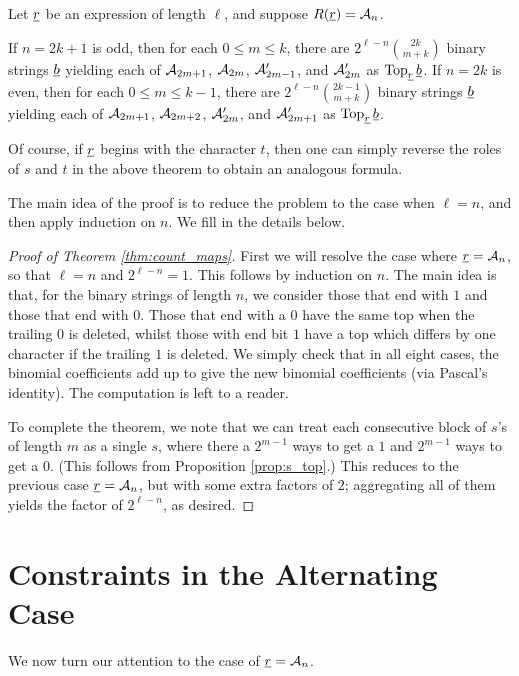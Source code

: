 \begin{theorem}
	Let $\ul r$ be an expression of length $\ell$, and suppose $R(\ul r) = \AA_n$.
	\begin{enumerate}[(i)]
		\ii If $n=2k+1$ is odd, then for each $0 \le m \le k$, there are $2^{\ell-n} \binom{2k}{m+k}$ binary strings $\ul b$ yielding each of $\AA_{2m+1}$, $\AA_{2m}$, $\AA_{2m-1}'$, and $\AA_{2m}'$ as $\Top_{\ul r} \ul b$.
		\ii If $n=2k$ is even, then for each $0 \le m \le k-1$, there are $2^{\ell-n} \binom{2k-1}{m+k}$ binary strings $\ul b$ yielding each of $\AA_{2m+1}$, $\AA_{2m+2}$, $\AA_{2m}'$, and $\AA_{2m+1}'$ as $\Top_{\ul r} \ul b$.
	\end{enumerate}
	\label{thm:count_maps}
\end{theorem}
Of course, if $\ul r$ begins with the character $t$, then one can simply reverse the roles of $s$ and $t$ in the above theorem to obtain an analogous formula.

The main idea of the proof is to reduce the problem to the case when $\ell = n$, and then apply induction on $n$.  We fill in the details below.

\begin{proof}[Proof of Theorem \ref{thm:count_maps}]
	First we will resolve the case where $\ul r = \AA_n$, so that $\ell = n$ and $2^{\ell-n} = 1$.  This follows by induction on $n$.  The main idea is that, for the binary strings of length $n$, we consider those that end with $1$ and those that end with $0$.  Those that end with a $0$ have the same top when the trailing $0$ is deleted, whilst those with end bit $1$ have a top which differs by one character if the trailing $1$ is deleted.  We simply check that in all eight cases, the binomial coefficients add up to give the new binomial coefficients (via Pascal's identity).  The computation is left to a reader.

	To complete the theorem, we note that we can treat each consecutive block of $s$'s of length $m$ as a single $s$, where there a $2^{m-1}$ ways to get a $1$ and $2^{m-1}$ ways to get a $0$.  (This follows from Proposition \ref{prop:s_top}.)  This reduces to the previous case $\ul r = \AA_n$, but with some extra factors of $2$; aggregating all of them yields the factor of $2^{\ell-n}$, as desired.
\end{proof}

\section{Constraints in the Alternating Case}
We now turn our attention to the case of $\ul r = \AA_n$.

